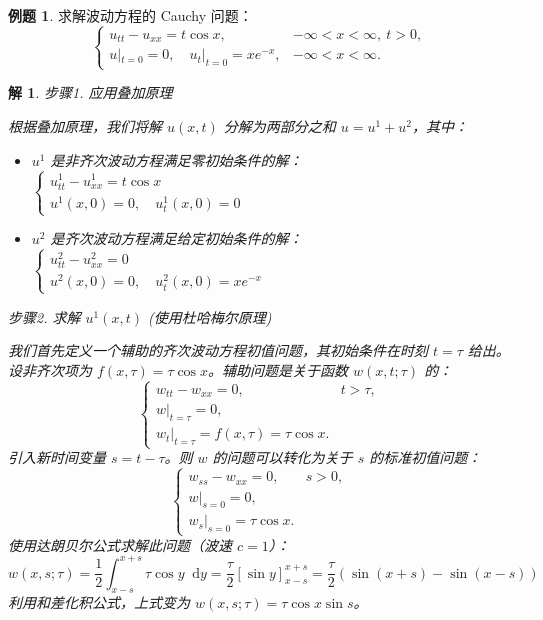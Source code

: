 \documentclass[12pt,a4paper]{article}
\newcommand{\diff}{\mathop{}\!\mathrm{d}}
\numberwithin{subsection}{section}
\numberwithin{subsubsection}{subsection}
\theoremstyle{plain}
\newtheorem{solution}{解}[subsection]
\theoremstyle{definition}
\newtheorem{example}{例题}[subsection]
\theoremstyle{remark}
\begin{document}
	\begin{example}
		求解波动方程的 Cauchy 问题：
		\[
		\begin{cases}
			u_{tt} - u_{xx} = t \cos x, & -\infty < x < \infty, \ t > 0, \\
			u|_{t=0} = 0, \quad u_t|_{t=0} = xe^{-x}, & -\infty < x < \infty.
		\end{cases}
		\]
		\begin{solution}
		步骤1. 应用叠加原理
		
		\noindent
		根据叠加原理，我们将解 $u(x,t)$ 分解为两部分之和 $u = u^1 + u^2$，其中：
		\begin{itemize}
			\item $u^1$ 是非齐次波动方程满足零初始条件的解：
			$
			\begin{cases}
				u^1_{tt} - u^1_{xx} = t\cos x \\
				u^1(x,0)=0, \quad u^1_{t}(x,0)=0
			\end{cases}
			$
			\item $u^2$ 是齐次波动方程满足给定初始条件的解：
			$
			\begin{cases}
				u^2_{tt} - u^2_{xx} = 0 \\
				u^2(x,0)=0, \quad u^2_{t}(x,0)=xe^{-x}
			\end{cases}
			$
		\end{itemize}
		
		
	步骤2. 求解 $u^1(x,t)$ (使用杜哈梅尔原理)
		
		\noindent
		我们首先定义一个辅助的齐次波动方程初值问题，其初始条件在时刻 $t=\tau$ 给出。设非齐次项为 $f(x,\tau) = \tau \cos x$。辅助问题是关于函数 $w(x, t; \tau)$ 的：
		\[
		\begin{cases}
			w_{tt} - w_{xx} = 0, & t > \tau, \\
			w|_{t=\tau} = 0, \\
			w_t|_{t=\tau} = f(x,\tau) = \tau \cos x.
		\end{cases}
		\]
		引入新时间变量 $s = t-\tau$。则 $w$ 的问题可以转化为关于 $s$ 的标准初值问题：
		\[
		\begin{cases}
			w_{ss} - w_{xx} = 0, & s > 0, \\
			w|_{s=0} = 0, \\
			w_s|_{s=0} = \tau \cos x.
		\end{cases}
		\]
		使用达朗贝尔公式求解此问题（波速 $c=1$）：
		\[
		w(x,s;\tau) = \frac{1}{2} \int_{x-s}^{x+s} \tau \cos y \diff y = \frac{\tau}{2}[\sin y]_{x-s}^{x+s} = \frac{\tau}{2}(\sin(x+s) - \sin(x-s))
		\]
		利用和差化积公式，上式变为 $w(x,s;\tau) = \tau \cos x \sin s$。
		

\end{solution}
\end{example}
\end{document}

